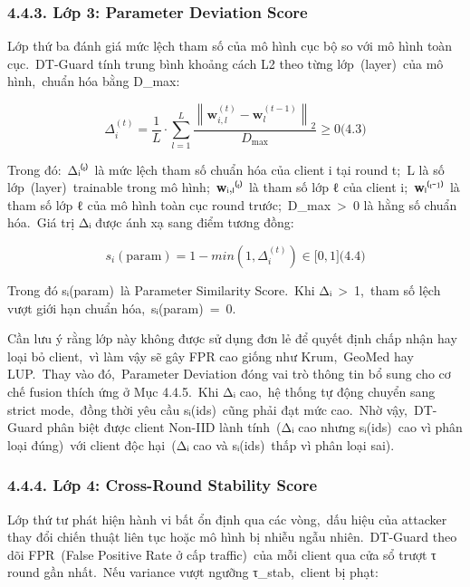 \subsubsection{4.4.3. Lớp 3: Parameter Deviation Score}\label{lux1edbp-3-parameter-deviation-score}

Lớp thứ ba đánh giá mức lệch tham số của mô hình cục bộ so với mô hình toàn cục.~DT-Guard tính trung bình khoảng cách L2 theo từng lớp~(layer)~của mô hình,~chuẩn hóa bằng D\_max:

\[\Delta_{i}^{(t)} = \frac{1}{L} \cdot \sum_{l = 1}^{L}\frac{\left\| \mathbf{w}_{i,l}^{(t)} - \mathbf{w}_{l}^{\left( t-1 \right)} \right\|_{2}}{D_{\max}} \geq 0\text{(4.3)}
\]

Trong đó:~Δᵢ⁽ᵗ⁾~là mức lệch tham số chuẩn hóa của client i tại round t;~L là số lớp~(layer)~trainable trong mô hình;~\textbf{w}ᵢ,ₗ⁽ᵗ⁾~là tham số lớp ℓ của client i;~\textbf{w}ₗ⁽ᵗ⁻¹⁾~là tham số lớp ℓ của mô hình toàn cục round trước;~D\_max~\textgreater~0 là hằng số chuẩn hóa.~Giá trị Δᵢ được ánh xạ sang điểm tương đồng:

\[s_{i}(\text{param}) = 1 - min(1,\Delta_{i}^{(t)}) \in \lbrack 0,1\rbrack\text{(4.4)}
\]

Trong đó sᵢ(param)~là Parameter Similarity Score.~Khi Δᵢ~\textgreater~1,~tham số lệch vượt giới hạn chuẩn hóa,~sᵢ(param)~=~0.

Cần lưu ý rằng lớp này không được sử dụng đơn lẻ để quyết định chấp nhận hay loại bỏ client,~vì làm vậy sẽ gây FPR cao giống như Krum,~GeoMed hay LUP.~Thay vào đó,~Parameter Deviation đóng vai trò thông tin bổ sung cho cơ chế fusion thích ứng ở Mục 4.4.5.~Khi Δᵢ cao,~hệ thống tự động chuyển sang strict mode,~đồng thời yêu cầu sᵢ(ids)~cũng phải đạt mức cao.~Nhờ vậy,~DT-Guard phân biệt được client Non-IID lành tính~(Δᵢ cao nhưng sᵢ(ids)~cao vì phân loại đúng)~với client độc hại~(Δᵢ cao và sᵢ(ids)~thấp vì phân loại sai).

\subsubsection{4.4.4. Lớp 4: Cross-Round Stability Score}\label{lux1edbp-4-cross-round-stability-score}

Lớp thứ tư phát hiện hành vi bất ổn định qua các vòng,~dấu hiệu của attacker thay đổi chiến thuật liên tục hoặc mô hình bị nhiễu ngẫu nhiên.~DT-Guard theo dõi FPR~(False Positive Rate ở cấp traffic)~của mỗi client qua cửa sổ trượt τ round gần nhất.~Nếu variance vượt ngưỡng τ\_stab,~client bị phạt:

